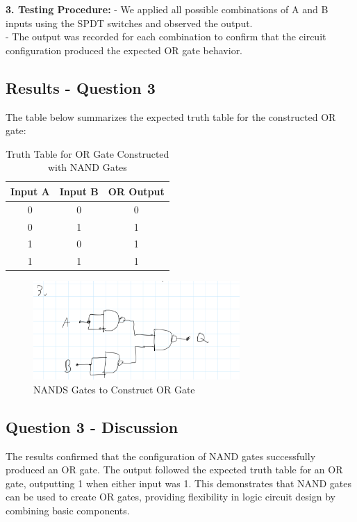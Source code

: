 \documentclass{article}
\begin{document}
   \textbf{3. Testing Procedure:}
      - We applied all possible combinations of A and B inputs using the SPDT switches and observed the output.
      \\
      - The output was recorded for each combination to confirm that the circuit configuration produced the expected OR gate behavior.
      \\
   
   \subsection*{\textbf{Results - Question 3}}
   The table below summarizes the expected truth table for the constructed OR gate:
   
   \begin{table}[H]
       \centering
       \caption{Truth Table for OR Gate Constructed with NAND Gates}
       \begin{tabular}{|c|c|c|}
           \hline
           Input A & Input B & OR Output \\
           \hline
           0 & 0 & 0 \\
           0 & 1 & 1 \\
           1 & 0 & 1 \\
           1 & 1 & 1 \\
           \hline
       \end{tabular}
   \end{table}

   \begin{figure}[H]
        \centering
        \includegraphics[width=0.7\textwidth]{./img/Lab 10/10_3_1.png}
        \caption{NANDS Gates to Construct OR Gate}
        \label{fig:or_gate}
    \end{figure}
   
   \subsection*{\textbf{Question 3 - Discussion}}
   The results confirmed that the configuration of NAND gates successfully produced an OR gate. The output followed the expected truth table for an OR gate, outputting 1 when either input was 1. This demonstrates that NAND gates can be used to create OR gates, providing flexibility in logic circuit design by combining basic components.
   
\end{document}
